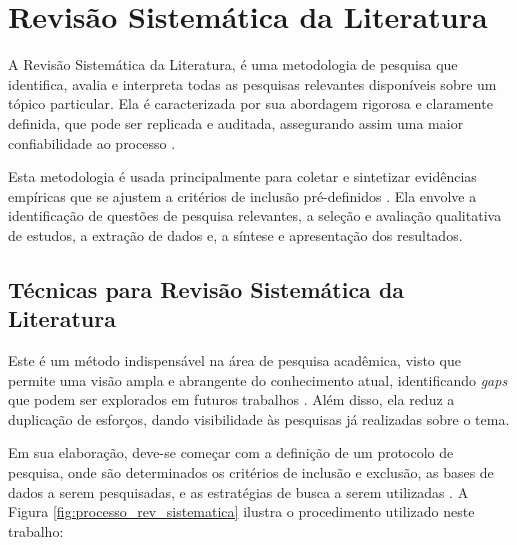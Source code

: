 \chapter{Revisão Sistemática da Literatura}
\label{cap_revisao-sistematica}

A Revisão Sistemática da Literatura, é uma metodologia de pesquisa que identifica, avalia e interpreta todas as pesquisas relevantes disponíveis sobre um tópico particular. Ela é caracterizada por sua abordagem rigorosa e claramente definida, que pode ser replicada e auditada, assegurando assim uma maior confiabilidade ao processo \cite{tranfield2003systematic}.

Esta metodologia é usada principalmente para coletar e sintetizar evidências empíricas que se ajustem a critérios de inclusão pré-definidos \cite{kitchenham2007guidelines}. Ela envolve a identificação de questões de pesquisa relevantes, a seleção e avaliação qualitativa de estudos, a extração de dados e, a síntese e apresentação dos resultados.


\section{Técnicas para Revisão Sistemática da Literatura}
\label{subcap_tec_rev-sistematica}

Este é um método indispensável na área de pesquisa acadêmica, visto que permite uma visão ampla e abrangente do conhecimento atual, identificando \textit{gaps} que podem ser explorados em futuros trabalhos \cite{petticrew2006systematic}. Além disso, ela reduz a duplicação de esforços, dando visibilidade às pesquisas já realizadas sobre o tema.

Em sua elaboração, deve-se começar com a definição de um protocolo de pesquisa, onde são determinados os critérios de inclusão e exclusão, as bases de dados a serem pesquisadas, e as estratégias de busca a serem utilizadas \cite{biolchini2005systematic}.  A Figura \ref{fig:processo_rev_sistematica} ilustra o procedimento utilizado neste trabalho:



